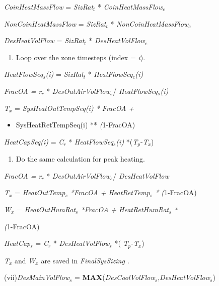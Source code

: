 \emph{CoinHeatMassFlow} = \emph{SizRat\(_{t}\)} * \emph{CoinHeatMassFlow\(_{c}\)}

\emph{NonCoinHeatMassFlow} = \emph{SizRat\(_{t}\)} * \emph{NonCoinHeatMassFlow\(_{c}\)}

\emph{DesHeatVolFlow} = \emph{SizRat\(_{t}\)} * \emph{DesHeatVolFlow\(_{c}\)}

\begin{enumerate}
\def\labelenumi{(\alph{enumi})}
\setcounter{enumi}{21}
\tightlist
\item
  Loop over the zone timesteps (index = \emph{i}).
\end{enumerate}

\emph{HeatFlowSeq\(_{s}\)(i)} = \emph{SizRat\(_{t}\)} * \emph{HeatFlowSeq\(_{c}\)(i)}

\emph{FracOA = r\(_{r}\)} * \emph{DesOutAirVolFlow\(_{s}\)}/ \emph{HeatFlowSeq\(_{s}\)(i)}

\emph{T\(_{x}\)} = \emph{SysHeatOutTempSeq(i) * FracOA +}

\begin{itemize}
\tightlist
\item
  SysHeatRetTempSeq(i) ** \emph{(}1-FracOA)
\end{itemize}

\emph{HeatCapSeq(i)} = \emph{C\(_{r}\)} * \emph{HeatFlowSeq\(_{s}\)(i)} *(\emph{T\(_{p}\)}-\emph{T\(_{x}\)})

\begin{enumerate}
\def\labelenumi{(\roman{enumi})}
\setcounter{enumi}{5}
\tightlist
\item
  Do the same calculation for peak heating.
\end{enumerate}

\emph{FracOA = r\(_{r}\)} * \emph{DesOutAirVolFlow\(_{s}\)}/ \emph{DesHeatVolFlow}

\emph{T\(_{x}\)} = \emph{HeatOutTemp\(_{s}\) *FracOA + HeatRetTemp\(_{s}\) *} \emph{(}1-FracOA)

\emph{W\(_{x}\)} = \emph{HeatOutHumRat\(_{s}\) *FracOA + HeatRetHumRat\(_{s}\) *}

\emph{(}1-FracOA)

\emph{HeatCap\(_{s}\)} = \emph{C\(_{r}\)} * \emph{DesHeatVolFlow\(_{s}\)} *( \emph{T\(_{p}\)}-\emph{T\(_{x}\)})

\emph{T\(_{x}\)} and \emph{W\(_{x}\)} are saved in \emph{FinalSysSizing} \emph{.}

(vii)\emph{DesMainVolFlow\(_{s}\)} = \textbf{MAX}(\emph{DesCoolVolFlow\(_{s}\)},\emph{DesHeatVolFlow\(_{s}\)})


